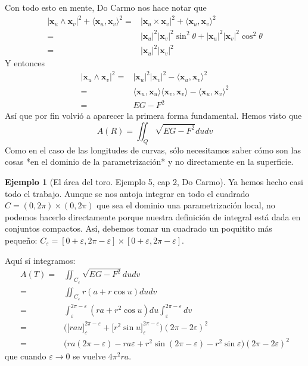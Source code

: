 \documentclass[spanish]{book}
\theoremstyle{definition}
\newtheorem*{ejem}{Ejemplo}
\begin{document}
Con todo esto en mente, Do Carmo nos hace notar que 
\begin{align*}
	|\mathbf{x}_u\wedge\mathbf{x}_v|^2+\langle\mathbf{x}_u,\mathbf{x}_v\rangle^2=&|\mathbf{x}_u\times\mathbf{x}_v|^2+\langle\mathbf{x}_u,\mathbf{x}_v\rangle^2\\
	=&|\mathbf{x}_u|^2|\mathbf{x}_v|^2\sin^2{\theta}+|\mathbf{x}_u|^2|\mathbf{x}_v|^2\cos^2{\theta}\\
	=&|\mathbf{x}_u|^2|\mathbf{x}_v|^2
\end{align*}
Y entonces
\begin{align*}
	|\mathbf{x}_u\wedge\mathbf{x}_v|^2=&|\mathbf{x}_u|^2|\mathbf{x}_v|^2-\langle\mathbf{x}_u,\mathbf{x}_v\rangle^2\\
	=&\langle\mathbf{x}_u,\mathbf{x}_u\rangle\langle\mathbf{x}_v,\mathbf{x}_v\rangle-\langle\mathbf{x}_u,\mathbf{x}_v\rangle^2\\
	=&EG-F^2
\end{align*}
Así que por fin volvió a aparecer la primera forma fundamental. Hemos visto que
\[A(R)=\iint_Q\sqrt{EG-F^2}dudv\]
Como en el caso de las longitudes de curvas, sólo necesitamos saber cómo son las cosas *en el dominio de la parametrización* y no directamente en la superficie.

\begin{ejem}[El área del toro. Ejemplo 5, cap 2, Do Carmo]
	Ya hemos hecho casi todo el trabajo. Aunque se nos antoja integrar en todo el cuadrado $C=(0,2\pi)\times(0,2\pi)$ que sea el dominio una parametrización local, no podemos hacerlo directamente porque nuestra definición de integral está dada en conjuntos compactos. Así, debemos tomar un cuadrado un poquitito más pequeño: $C_\varepsilon=[0+\varepsilon,2\pi-\varepsilon]\times[0+\varepsilon,2\pi-\varepsilon]$.
	
	Aquí sí integramos:
	\begin{align*}
		A(T)=&\iint_{C_\varepsilon}\sqrt{EG-F^2}dudv\\
		=&\iint_{C_\varepsilon}r(a+r\cos{u})dudv\\
		=&\int_{\varepsilon}^{2\pi-\varepsilon}(ra+r^2\cos{u})du\int_{\varepsilon}^{2\pi-\varepsilon}dv\\
		=&\big(\big[rau\big]_{\varepsilon}^{2\pi-\varepsilon}+\big[r^2\sin{u}\big]_{\varepsilon}^{2\pi-\varepsilon}\big)(2\pi-2\varepsilon)^2\\
		=&\big(ra(2\pi-\varepsilon)-ra\varepsilon+r^2\sin{(2\pi-\varepsilon)}-r^2\sin{\varepsilon}\big)(2\pi-2\varepsilon)^2
	\end{align*}
	que cuando $\varepsilon\to0$ se vuelve $4\pi^2ra$.
\end{ejem}
\end{document}
